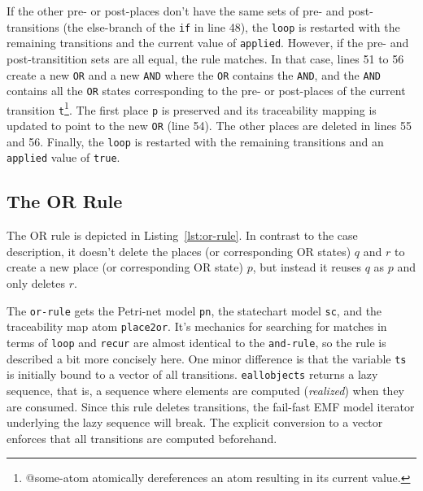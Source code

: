 \documentclass[11pt]{article}
\begin{document}
If the other pre- or post-places don't have the same sets of pre- and
post-transitions (the else-branch of the \verb|if| in line 48), the \verb|loop|
is restarted with the remaining transitions and the current value of
\verb|applied|.  However, if the pre- and post-transitition sets are all equal,
the rule matches.  In that case, lines 51 to 56 create a new \verb|OR| and a
new \verb|AND| where the \verb|OR| contains the \verb|AND|, and the \verb|AND|
contains all the \verb|OR| states corresponding to the pre- or post-places of
the current transition \verb|t|\footnote{\textsf{@some-atom atomically
    dereferences an atom resulting in its current value.}}.  The first place
\verb|p| is preserved and its traceability mapping is updated to point to the
new \verb|OR| (line 54).  The other places are deleted in lines 55 and 56.
Finally, the \verb|loop| is restarted with the remaining transitions and an
\verb|applied| value of \verb|true|.

\subsection{The OR Rule}
\label{sec:or-rule}

The OR rule is depicted in Listing~\ref{lst:or-rule}.  In contrast to the case
description, it doesn't delete the places (or corresponding OR states) $q$ and
$r$ to create a new place (or corresponding OR state) $p$, but instead it
reuses $q$ as $p$ and only deletes $r$.

The \verb|or-rule| gets the Petri-net model \verb|pn|, the statechart model
\verb|sc|, and the traceability map atom \verb|place2or|.  It's mechanics for
searching for matches in terms of \verb|loop| and \verb|recur| are almost
identical to the \verb|and-rule|, so the rule is described a bit more concisely
here.  One minor difference is that the variable \verb|ts| is initially bound
to a vector of all transitions.  \verb|eallobjects| returns a lazy sequence,
that is, a sequence where elements are computed (\emph{realized}) when they are
consumed.  Since this rule deletes transitions, the fail-fast EMF model
iterator underlying the lazy sequence will break.  The explicit conversion to a
vector enforces that all transitions are computed beforehand.
\end{document}

